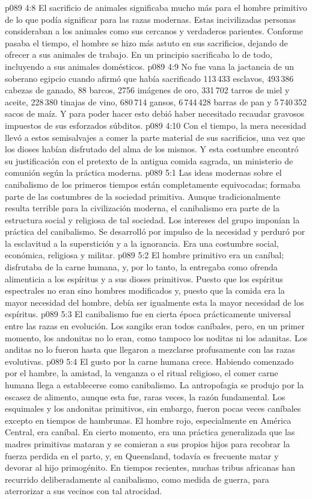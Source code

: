 \vs p089 4:8 \pc El sacrificio de animales significaba mucho más para el hombre primitivo de lo que podía significar para las razas modernas. Estas incivilizadas personas consideraban a los animales como sus cercanos y verdaderos parientes. Conforme pasaba el tiempo, el hombre se hizo más astuto en sus sacrificios, dejando de ofrecer a sus animales de trabajo. En un principio sacrificaba lo  de todo, incluyendo a sus animales domésticos.
\vs p089 4:9 No fue vana la jactancia de un soberano egipcio cuando afirmó que había sacrificado 113\,433 esclavos, 493\,386 cabezas de ganado, 88 barcos, 2756 imágenes de oro, 331\,702 tarros de miel y aceite, 228\,380 tinajas de vino, 680\,714 gansos, 6\,744\,428 barras de pan y 5\,740\,352 sacos de maíz. Y para poder hacer esto debió haber necesitado recaudar gravosos impuestos de sus esforzados súbditos.
\vs p089 4:10 Con el tiempo, la mera necesidad llevó a estos semisalvajes a comer la parte material de sus sacrificios, una vez que los dioses habían disfrutado del alma de los mismos. Y esta costumbre encontró su justificación con el pretexto de la antigua comida sagrada, un ministerio de comunión según la práctica moderna.
\vs p089 5:1 Las ideas modernas sobre el canibalismo de los primeros tiempos están completamente equivocadas; formaba parte de las costumbres de la sociedad primitiva. Aunque tradicionalmente resulta terrible para la civilización moderna, el canibalismo era parte de la estructura social y religiosa de tal sociedad. Los intereses del grupo imponían la práctica del canibalismo. Se desarrolló por impulso de la necesidad y perduró por la esclavitud a la superstición y a la ignorancia. Era una costumbre social, económica, religiosa y militar.
\vs p089 5:2 El hombre primitivo era un caníbal; disfrutaba de la carne humana, y, por lo tanto, la entregaba como ofrenda alimenticia a los espíritus y a sus dioses primitivos. Puesto que los espíritus espectrales no eran sino hombres modificados y, puesto que la comida era la mayor necesidad del hombre, debía ser igualmente esta la mayor necesidad de los espíritus.
\vs p089 5:3 El canibalismo fue en cierta época prácticamente universal entre las razas en evolución. Los sangiks eran todos caníbales, pero, en un primer momento, los andonitas no lo eran, como tampoco los noditas ni los adanitas. Los anditas no lo fueron hasta que llegaron a mezclarse profusamente con las razas evolutivas.
\vs p089 5:4 El gusto por la carne humana crece. Habiendo comenzado por el hambre, la amistad, la venganza o el ritual religioso, el comer carne humana llega a establecerse como canibalismo. La antropofagia se produjo por la escasez de alimento, aunque esta fue, raras veces, la razón fundamental. Los esquimales y los andonitas primitivos, sin embargo, fueron pocas veces caníbales excepto en tiempos de hambrunas. El hombre rojo, especialmente en América Central, era caníbal. En cierto momento, era una práctica generalizada que las madres primitivas mataran y se comieran a sus propios hijos para recobrar la fuerza perdida en el parto, y, en Queensland, todavía es frecuente matar y devorar al hijo primogénito. En tiempos recientes, muchas tribus africanas han recurrido deliberadamente al canibalismo, como medida de guerra, para aterrorizar a sus vecinos con tal atrocidad.
